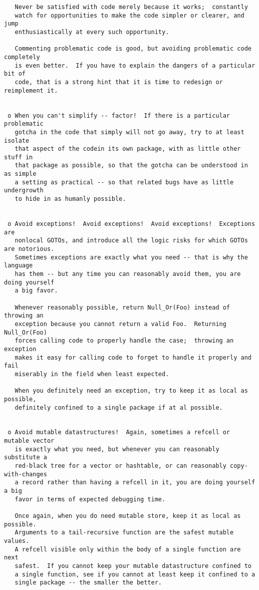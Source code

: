 \begin{verbatim}
   Never be satisfied with code merely because it works;  constantly
   watch for opportunities to make the code simpler or clearer, and jump
   enthusiastically at every such opportunity.

   Commenting problematic code is good, but avoiding problematic code completely
   is even better.  If you have to explain the dangers of a particular bit of
   code, that is a strong hint that it is time to redesign or reimplement it.


 o When you can't simplify -- factor!  If there is a particular problematic
   gotcha in the code that simply will not go away, try to at least isolate
   that aspect of the codein its own package, with as little other stuff in
   that package as possible, so that the gotcha can be understood in as simple
   a setting as practical -- so that related bugs have as little undergrowth
   to hide in as humanly possible.


 o Avoid exceptions!  Avoid exceptions!  Avoid exceptions!  Exceptions are
   nonlocal GOTOs, and introduce all the logic risks for which GOTOs are notorious.
   Sometimes exceptions are exactly what you need -- that is why the language
   has them -- but any time you can reasonably avoid them, you are doing yourself
   a big favor.

   Whenever reasonably possible, return Null_Or(Foo) instead of throwing an
   exception because you cannot return a valid Foo.  Returning Null_Or(Foo)
   forces calling code to properly handle the case;  throwing an exception
   makes it easy for calling code to forget to handle it properly and fail
   miserably in the field when least expected.

   When you definitely need an exception, try to keep it as local as possible,
   definitely confined to a single package if at al possible.


 o Avoid mutable datastructures!  Again, sometimes a refcell or mutable vector
   is exactly what you need, but whenever you can reasonably substitute a
   red-black tree for a vector or hashtable, or can reasonably copy-with-changes
   a record rather than having a refcell in it, you are doing yourself a big
   favor in terms of expected debugging time.

   Once again, when you do need mutable store, keep it as local as possible.
   Arguments to a tail-recursive function are the safest mutable values.
   A refcell visible only within the body of a single function are next
   safest.  If you cannot keep your mutable datastructure confined to
   a single function, see if you cannot at least keep it confined to a
   single package -- the smaller the better.



\end{verbatim}
